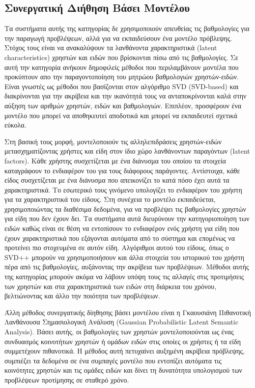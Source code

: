 \subsection{Συνεργατική Διήθηση Βάσει Μοντέλου}
Τα συστήματα αυτής της κατηγορίας δε χρησιμοποιούν απευθείας τις βαθμολογίες για την παραγωγή προβλέψεων, αλλά για να εκπαιδεύσουν ένα μοντέλο πρόβλεψης. Στόχος τους είναι να ανακαλύψουν τα λανθάνοντα χαρακτηριστικά ({\en latent characteristics}) χρηστών και ειδών που βρίσκονται πίσω από τις βαθμολογίες. Σε αυτή την κατηγορία ανήκουν δημοφιλείς μέθοδοι που περιλαμβάνουν μοντέλα που προκύπτουν απο την παραγοντοποίηση του μητρώου βαθμολογιών χρηστών-ειδών. Είναι γνωστές ως μέθοδοι που βασίζονται στον αλγόριθμο {\en SVD (SVD-based)} και διακρίνονται για την ακρίβεια και την ικανότητά τους να ανταποκρίνονται καλά στην αύξηση των αριθμών χρηστών, ειδών και βαθμολογιών. Επιπλέον, προσφέρουν ένα μοντέλο που μπορεί να αποθηκευτεί αποδοτικά και μπορεί να εκπαιδευτεί σχετικά εύκολα. \par
Στη βασική τους μορφή, μοντελοποιούν τις αλληλεπιδράσεις χρηστών-ειδών μετασχηματίζοντας χρήστες και είδη στον ίδιο χώρο λανθάνοντων παραγόντων {(\en latent factors)}. Kάθε χρήστης συσχετίζεται με ένα διάνυσμα του οποίου τα στοιχεία καταγράφουν το ενδιαφέρον του για τους διάφορους παράγοντες. Αντίστοιχα, κάθε είδος συσχετίζεται με ένα διάνυσμα που απεικονίζει το κατά πόσο έχει αυτά τα χαρακτηριστικά. Το εσωτερικό τους γινόμενο υπολογίζει το ενδιαφέρον του χρήστη για τα χαρακτηριστικά του είδους. Στη συνέχεια το μοντέλο εκπαιδεύεται, χρησιμοποιώντας τα διαθέσιμα δεδομένα, για να προβλέψει τις βαθμολογίες χρηστών για είδη που δεν έχουν δει. Τα συστήματα αυτά διευρύνουν την κατηγοριοποίηση των ειδών καθώς είναι σε θέση να εντοπίσουν το ενδιαφέρον ενός χρήστη για είδη που έχουν χαρακτηριστικά που εξάγονται αυτόματα από το σύστημα και επομένως να προτείνει πιο στοχευμένα σε αυτόν είδη. Αλγόριθμοι αυτού του είδους, όπως ο {\en SVD++} \cite{Koren:2008:FMN:1401890.1401944} μπορούν να χρησιμοποιήσουν και άλλα στοιχεία του ιστορικού του χρήστη πέρα από τις βαθμολογίες, αυξάνοντας την ακρίβεια των προβλέψεων. Μέθοδοι αυτής της κατηγορίας μπορούν ακόμα να λάβουν υπόψη τους τις αλλαγές στις προτιμήσεις των χρηστών και στα χαρακτηριστικά των ειδών στη διάρκεια του χρόνου, βελτιώνοντας και άλλο την ποιότητα των προβλέψεων. \cite{ricci2011recommender}\par
Άλλη μέθοδος συνεργατικής δίηθησης βάσει μοντέλου είναι η Γκαουσιάνη Πιθανοτική Λανθάνουσα Σημασιολογική Ανάλυση ({\en Gaussian Probabilistic Latent Semantic Analysis})\cite{hofmann2003collaborative}. Βάσει αυτής, οι βαθμολογίες των χρηστών μοντελοποιού\-νται ως ένας συνδυασμός κοινοτήτων χρηστών ή ομάδων ειδών στις οποίες οι χρήστες ή τα είδη συμμετέχουν πιθανοτικά. Η μέθοδος αυτή πετυχαίνει αυξημένη ακρίβεια πρόβλεψης, συμπιέζει τα δεδομένα σε ένα συμπαγές μοντέλο που εντοπίζει αυτόματα τις κοινότητες χρηστών και τις ομάδες ειδών και δίνει τη δυνατότητα υπολογισμού των προβλέψεων προτίμησης σε σταθερό χρόνο.
